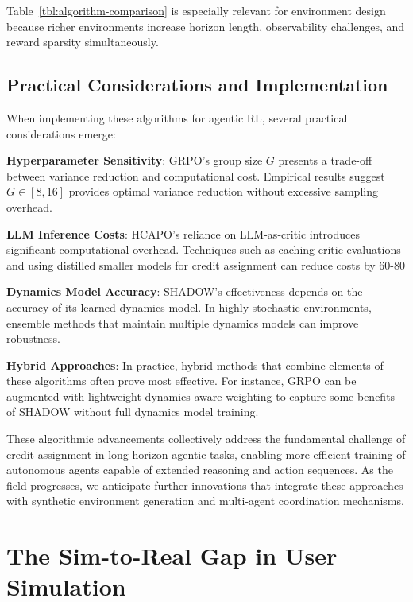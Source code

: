 Table~\ref{tbl:algorithm-comparison} is especially relevant for environment design because richer environments increase horizon length, observability challenges, and reward sparsity simultaneously.

\subsection{Practical Considerations and Implementation}

When implementing these algorithms for agentic RL, several practical considerations emerge:

\textbf{Hyperparameter Sensitivity}: GRPO's group size $G$ presents a trade-off between variance reduction and computational cost. Empirical results suggest $G \in [8, 16]$ provides optimal variance reduction without excessive sampling overhead.

\textbf{LLM Inference Costs}: HCAPO's reliance on LLM-as-critic introduces significant computational overhead. Techniques such as caching critic evaluations and using distilled smaller models for credit assignment can reduce costs by 60-80%

\textbf{Dynamics Model Accuracy}: SHADOW's effectiveness depends on the accuracy of its learned dynamics model. In highly stochastic environments, ensemble methods that maintain multiple dynamics models can improve robustness.

\textbf{Hybrid Approaches}: In practice, hybrid methods that combine elements of these algorithms often prove most effective. For instance, GRPO can be augmented with lightweight dynamics-aware weighting to capture some benefits of SHADOW without full dynamics model training.

These algorithmic advancements collectively address the fundamental challenge of credit assignment in long-horizon agentic tasks, enabling more efficient training of autonomous agents capable of extended reasoning and action sequences. As the field progresses, we anticipate further innovations that integrate these approaches with synthetic environment generation and multi-agent coordination mechanisms.
\section{The Sim-to-Real Gap in User Simulation}

